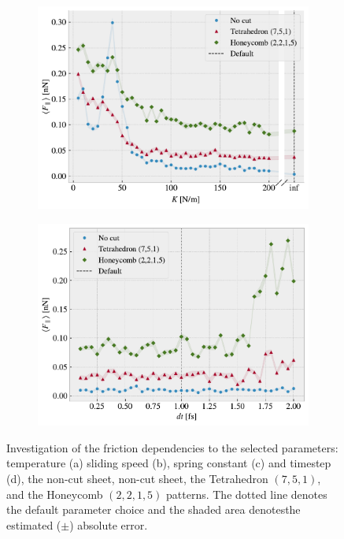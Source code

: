 \begin{figure}[H]
\begin{subfigure}[t]{0.49\textwidth}
      \centering
      \includegraphics[width=\textwidth]{figures/baseline/variables_spring_mean_fixmove.pdf}
      \caption{}
      \label{fig:var_K}
    \end{subfigure}
    \hfill
    \begin{subfigure}[t]{0.49\textwidth}
        \centering
        \includegraphics[width=\textwidth]{figures/baseline/variables_dt_mean_fixmove.pdf}
        \caption{}
        \label{fig:var_dt}
    \end{subfigure}
    \hfill
    \caption{Investigation of the friction dependencies to the selected parameters: temperature (a) sliding speed (b), spring constant (c) and timestep (d), the non-cut sheet, non-cut sheet, the Tetrahedron $(7,5,1)$, and the Honeycomb $(2,2,1,5)$ patterns. The dotted line denotes the default parameter choice and the shaded area denotesthe estimated ($\pm$) absolute error.}
    \label{fig:main_param}
\end{figure}

